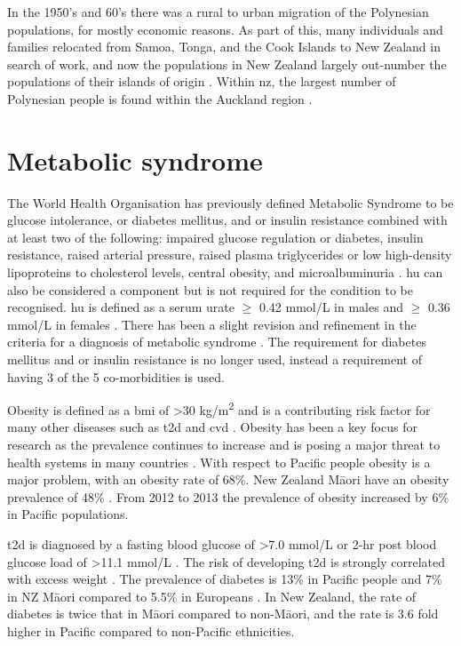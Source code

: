 \documentclass[]{report}
\newcommand{\tex}[1]{#1}
\begin{document}
In the 1950's and 60's there was a rural to urban migration of the
Polynesian populations, for mostly economic reasons. As part of this,
many individuals and families relocated from Samoa, Tonga, and the Cook
Islands to New Zealand in search of work, and now the populations in New
Zealand largely out-number the populations of their islands of origin
\citep{MatisooSmith2012highway}. Within \glsdesc{nz}, the largest number
of Polynesian people is found within the Auckland region
\citep{Barcham2009}.

\section{Metabolic syndrome}\label{metabolic-syndrome}

The World Health Organisation has previously defined Metabolic Syndrome
to be glucose intolerance, or diabetes mellitus, and or insulin
resistance combined with at least two of the following: impaired glucose
regulation or diabetes, insulin resistance, raised arterial pressure,
raised plasma triglycerides or low high-density lipoproteins to
cholesterol levels, central obesity, and microalbuminuria
\citep{Alberti1998}. \Gls{hu} can also be considered a component but is
not required for the condition to be recognised. \gls{hu} is defined as
a serum urate \(\geq\) 0.42 mmol/L in males and \(\geq\) 0.36 mmol/L in
females \citep{Choi2007b}. There has been a slight revision and
refinement in the criteria for a diagnosis of metabolic syndrome
\citep{Alberti2009}. The requirement for diabetes mellitus and or
insulin resistance is no longer used, instead a requirement of having 3
of the 5 co-morbidities is used.

Obesity is defined as a \gls{bmi} of \textgreater{}30
kg/m\textsuperscript{2} and is a contributing risk factor for many other
diseases such as \gls{t2d} and \gls{cvd} \citep{Haslam2005}. Obesity has
been a key focus for research as the prevalence continues to increase
and is posing a major threat to health systems in many countries
\citep{Wang2011}. With respect to Pacific people obesity is a major
problem, with an obesity rate of 68\%. New Zealand M\tex{\={a}}ori have
an obesity prevalence of 48\% \citep{Health2013}. From 2012 to 2013 the
prevalence of obesity increased by 6\% in Pacific populations.

\Gls{t2d} is diagnosed by a fasting blood glucose of \textgreater{}7.0
mmol/L or 2-hr post blood glucose load of \textgreater{}11.1 mmol/L
\citep{Alberti1998}. The risk of developing \gls{t2d} is strongly
correlated with excess weight \citep{Rana2007}. The prevalence of
diabetes is 13\% in Pacific people and 7\% in NZ M\tex{\={a}}ori
\citep{Health2013} compared to 5.5\% in Europeans \citep{Winnard2013}.
In New Zealand, the rate of diabetes is twice that in M\tex{\={a}}ori
compared to non-M\tex{\={a}}ori, and the rate is 3.6 fold higher in
Pacific compared to non-Pacific ethnicities.
\end{document}
